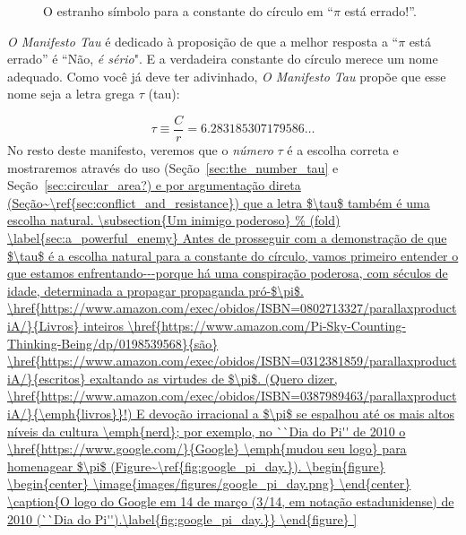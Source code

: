 \begin{figure}
\caption{O estranho símbolo para a constante do círculo em ``$\pi$ está errado!''.\label{fig:palais_tau}}
\end{figure}

\emph{O Manifesto Tau} é dedicado à proposição de que a melhor resposta a ``$\pi$ está errado'' é ``Não, \emph{é sério}". E a verdadeira constante do círculo merece um nome adequado. Como você já deve ter adivinhado, \emph{O Manifesto Tau} propõe que esse nome seja a letra grega $\tau$ (tau):

\begin{equation}
\label{eq:tau}
\tau \equiv \frac{C}{r} = 6.283185307179586\ldots
\end{equation}
No resto deste manifesto, veremos que o \emph{número} $\tau$ é a escolha correta e mostraremos através do uso (Seção~\ref{sec:the_number_tau} e Seção~\ref{sec:circular_area?) e por argumentação direta (Seção~\ref{sec:conflict_and_resistance}) que a letra $\tau$ também é uma escolha natural.

\subsection{Um inimigo poderoso} %
 \label{sec:a_powerful_enemy}

Antes de prosseguir com a demonstração de que $\tau$ é a escolha natural para a constante do círculo, vamos primeiro entender o que estamos enfrentando---porque há uma conspiração poderosa, com séculos de idade, determinada a propagar propaganda pró-$\pi$. \href{https://www.amazon.com/exec/obidos/ISBN=0802713327/parallaxproductiA/}{Livros} inteiros \href{https://www.amazon.com/Pi-Sky-Counting-Thinking-Being/dp/0198539568}{são} \href{https://www.amazon.com/exec/obidos/ISBN=0312381859/parallaxproductiA/}{escritos} exaltando as virtudes de $\pi$. (Quero dizer, \href{https://www.amazon.com/exec/obidos/ISBN=0387989463/parallaxproductiA/}{\emph{livros}}!) E devoção irracional a $\pi$ se espalhou até os mais altos níveis da cultura \emph{nerd}; por exemplo, no ``Dia do Pi'' de 2010 o \href{https://www.google.com/}{Google} \emph{mudou seu logo} para homenagear $\pi$ (Figure~\ref{fig:google_pi_day.}).

\begin{figure}
\begin{center}
\image{images/figures/google_pi_day.png}
\end{center}
\caption{O logo do Google em 14 de março (3/14, em notação estadunidense) de 2010 (``Dia do Pi'').\label{fig:google_pi_day.}}
\end{figure}

}

